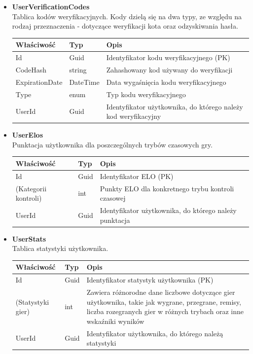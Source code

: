 \documentclass[12pt,a4paper]{article}
\begin{document}
\begin{itemize}
    \item \textbf{UserVerificationCodes}\\
    Tablica kodów weryfikacyjnych. Kody dzielą się na dwa typy, ze względu na rodzaj przeznaczenia - dotyczące weryfikacji kota oraz odzyskiwania hasła.
    \renewcommand{\arraystretch}{1.5}
    \begin{longtable}{|m{4cm}|m{2cm}|m{8cm}|}
        \hline
        \rowcolor{lightgray}
        \textbf{Właściwość} & \textbf{Typ} & \textbf{Opis} \\ \hline
        \endhead
        \hline
        Id & Guid & Identyfikator kodu weryfikacyjnego (PK) \\ \hline
        CodeHash & string & Zahashowany kod używany do weryfikacji \\ \hline
        ExpirationDate & DateTime & Data wygaśnięcia kodu weryfikacyjnego \\ \hline
        Type & enum & Typ kodu weryfikacyjnego \\ \hline
        UserId & Guid & Identyfikator użytkownika, do którego należy kod weryfikacyjny \\ \hline
    \end{longtable}

\newpage

    \item \textbf{UserElos}\\
    Punktacja użytkownika dla poszczególnych trybów czasowych gry.
    \renewcommand{\arraystretch}{1.5}
    \begin{longtable}{|m{4cm}|m{2cm}|m{8cm}|}
        \hline
        \rowcolor{lightgray}
        \textbf{Właściwość} & \textbf{Typ} & \textbf{Opis} \\ \hline
        \endhead
        \hline
        Id & Guid & Identyfikator ELO (PK) \\ \hline
        (Kategorii kontroli) & int & Punkty ELO dla konkretnego trybu kontroli czasowej \\ \hline
        UserId & Guid & Identyfikator użytkownika, do którego należy punktacja \\ \hline
    \end{longtable}

    \item \textbf{UserStats}\\
    Tablica statystyki użytkownika.
    \renewcommand{\arraystretch}{1.5}
    \begin{longtable}{|m{4cm}|m{2cm}|m{8cm}|}
        \hline
        \rowcolor{lightgray}
        \textbf{Właściwość} & \textbf{Typ} & \textbf{Opis} \\ \hline
        \endhead
        \hline
        Id & Guid & Identyfikator statystyk użytkownika (PK) \\ \hline
        (Statystyki gier) & int & Zawiera różnorodne dane liczbowe dotyczące gier użytkownika, takie jak wygrane, przegrane, remisy, liczba rozegranych gier w różnych trybach oraz inne wskaźniki wyników \\ \hline
        UserId & Guid & Identyfikator użytkownika, do którego należą statystyki \\ \hline
    \end{longtable}
        

\end{itemize}
\end{document}
